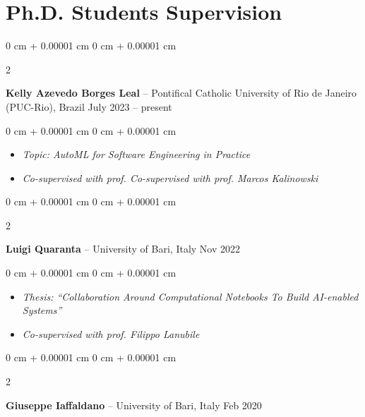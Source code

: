 \documentclass[10pt, a4paper]{article}
\newenvironment{highlights}{
    \begin{itemize}[
        topsep=0.10 cm,
        parsep=0.10 cm,
        partopsep=0pt,
        itemsep=0pt,
        leftmargin=0 cm + 10pt
    ]
}{
    \end{itemize}
} %
\newenvironment{onecolentry}{
    \begin{adjustwidth}{
        0 cm + 0.00001 cm
    }{
        0 cm + 0.00001 cm
    }
}{
    \end{adjustwidth}
} %
\newenvironment{twocolentry}[2][]{
    \onecolentry
    \def\secondColumn{#2}
    \setcolumnwidth{\fill, 4.5 cm}
    \begin{paracol}{2}
}{
    \switchcolumn \raggedleft \secondColumn
    \end{paracol}
    \endonecolentry
} %
\begin{document}
    
    \section{Ph.D. Students Supervision}



        
        \begin{twocolentry}{
            July 2023 – present
        }
            \textbf{Kelly Azevedo Borges Leal} -- Pontifical Catholic University of Rio de Janeiro (PUC-Rio), Brazil\end{twocolentry}

        \vspace{0.10 cm}
        \begin{onecolentry}
            \begin{highlights}
                \item \textit{Topic: AutoML for Software Engineering in Practice}
                \item \textit{Co-supervised with prof. Co-supervised with prof. Marcos Kalinowski}
            \end{highlights}
        \end{onecolentry}


        \vspace{0.2 cm}

        \begin{twocolentry}{
            Nov 2022
        }
            \textbf{Luigi Quaranta} -- University of Bari, Italy\end{twocolentry}

        \vspace{0.10 cm}
        \begin{onecolentry}
            \begin{highlights}
                \item \textit{Thesis: ``Collaboration Around Computational Notebooks To Build AI-enabled Systems''}
                \item \textit{Co-supervised with prof. Filippo Lanubile}
            \end{highlights}
        \end{onecolentry}


        \vspace{0.2 cm}

        \begin{twocolentry}{
            Feb 2020
        }
            \textbf{Giuseppe Iaffaldano} -- University of Bari, Italy\end{twocolentry}
\end{document}

